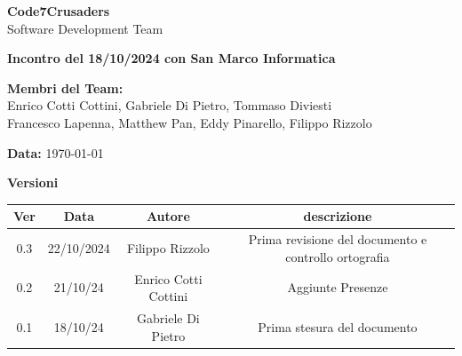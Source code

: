 \documentclass{article}
\begin{document}
\begin{titlepage}
    {\Huge \textbf{Code7Crusaders}}\\
    \vspace{0.5cm}
    {\Large Software Development Team}\\
    \vspace{2cm}
    
    {\large \textbf{Incontro del 18/10/2024 con San Marco Informatica}}\\
    \vspace{5cm}

    \textbf{Membri del Team:}\\
    Enrico Cotti Cottini, Gabriele Di Pietro, Tommaso Diviesti \\
    Francesco Lapenna, Matthew Pan, Eddy Pinarello, Filippo Rizzolo \\
    \vspace{0.5cm}
    
    {\large \textbf{Data:}} \today\\
    
    \vspace{1cm}
\end{titlepage}

\newpage
\begin{center}
    \textbf{Versioni}
    \\
    \begin{tabular}{|c|c|c|c|}
        \hline
        \textbf{Ver} & \textbf{Data} & \textbf{Autore} & \textbf{descrizione}\\
        \hline
        0.3 & 22/10/2024 & Filippo Rizzolo & Prima revisione del documento e controllo ortografia \\ 
        \hline
	0.2 & 21/10/24 & Enrico Cotti Cottini & Aggiunte Presenze \\
	\hline
        0.1 & 18/10/24 & Gabriele Di Pietro & Prima stesura del documento \\
        \hline
    \end{tabular}
\end{center}
\newpage
\end{document}
